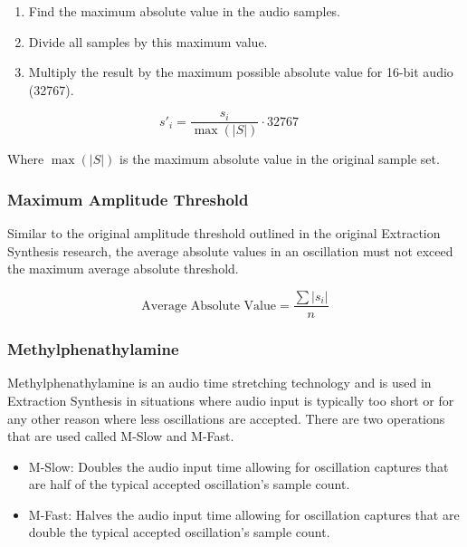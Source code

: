 \documentclass[12pt,a4paper]{article}
\begin{document}
\begin{enumerate}
\item Find the maximum absolute value in the audio samples.
\item Divide all samples by this maximum value.
\item Multiply the result by the maximum possible absolute value for 16-bit audio (32767).
\end{enumerate}
\begin{equation*}
s'_i = \frac{s_i}{\max(|S|)} \cdot 32767 \quad
\end{equation*}

Where $\max(|S|)$ is the maximum absolute value in the original sample set.

\subsubsection{Maximum Amplitude Threshold}
Similar to the original amplitude threshold outlined in the original Extraction Synthesis research, the average absolute values in an oscillation must not exceed the maximum average absolute threshold.

\begin{equation*}
    \text{Average Absolute Value} = \frac{\sum|s_i|}{n}
\end{equation*}
{\centering \small{} \par}

\subsubsection{Methylphenathylamine}
Methylphenathylamine is an audio time stretching technology and is used in Extraction Synthesis in situations where audio input is typically too short or for any other reason where less oscillations are accepted. There are two operations that are used called M-Slow and M-Fast.

\begin{itemize}
    \item M-Slow: Doubles the audio input time allowing for oscillation captures that are half of the typical accepted oscillation's sample count.
    \item M-Fast: Halves the audio input time allowing for oscillation captures that are double the typical accepted oscillation's sample count.
\end{itemize}
\end{document}
